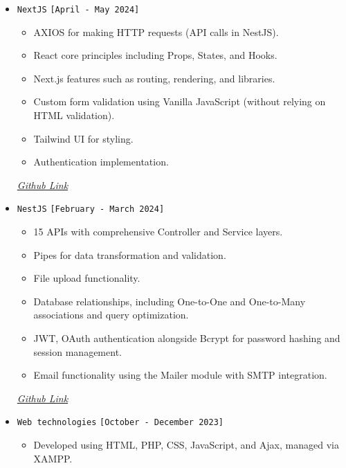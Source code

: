 \documentclass[a4paper,12pt]{article}
\begin{document}
\begin{itemize}
    \item \texttt{NextJS} \hfill \texttt{[April - May 2024]}  
    \begin{itemize}[label=--]
        \item AXIOS for making HTTP requests (API calls in NestJS).
        \item React core principles including Props, States, and Hooks.
        \item Next.js features such as routing, rendering, and libraries.
        \item Custom form validation using Vanilla JavaScript (without relying on HTML validation).
        \item Tailwind UI for styling.
        \item Authentication implementation.
    \end{itemize}

    \hfill \href{https://github.com/0Sa-ad0/advanced-web-tech/tree/main/NextJS}{\textit{Github Link}} 
    \vspace{0.3cm}

    \item \texttt{NestJS} \hfill \texttt{[February - March 2024]}  
    \begin{itemize}[label=--]
        \item 15 APIs with comprehensive Controller and Service layers.
        \item Pipes for data transformation and validation.
        \item File upload functionality.
        \item Database relationships, including One-to-One and One-to-Many associations and query optimization.
        \item JWT, OAuth authentication alongside Bcrypt for password hashing and session management.
        \item Email functionality using the Mailer module with SMTP integration.
    \end{itemize} 

    \hfill \href{https://github.com/0Sa-ad0/advanced-web-tech/tree/main/NestJS}{\textit{Github Link}}  
    \vspace{0.3cm}

    \item \texttt{Web technologies} \hfill \texttt{[October - December 2023]}  
    \begin{itemize}[label=--]
        \item Developed using HTML, PHP, CSS, JavaScript, and Ajax, managed via XAMPP.
        

\end{itemize}
\end{itemize}
\end{document}
